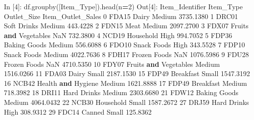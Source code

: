 \documentclass[
]{book}
\newenvironment{Shaded}{\begin{snugshade}}{\end{snugshade}}
\newcommand{\DecValTok}[1]{\textcolor[rgb]{0.00,0.00,0.81}{#1}}
\newcommand{\FloatTok}[1]{\textcolor[rgb]{0.00,0.00,0.81}{#1}}
\newcommand{\KeywordTok}[1]{\textcolor[rgb]{0.13,0.29,0.53}{\textbf{#1}}}
\newcommand{\NormalTok}[1]{#1}
\newcommand{\OperatorTok}[1]{\textcolor[rgb]{0.81,0.36,0.00}{\textbf{#1}}}
\newcommand{\StringTok}[1]{\textcolor[rgb]{0.31,0.60,0.02}{#1}}
\begin{document}
\begin{Shaded}
\begin{Highlighting}[]
\NormalTok{In [}\DecValTok{4}\NormalTok{]: df.groupby([}\StringTok{\textquotesingle{}Item\_Type\textquotesingle{}}\NormalTok{]).head(n}\OperatorTok{=}\DecValTok{2}\NormalTok{)}
\NormalTok{Out[}\DecValTok{4}\NormalTok{]:}
\NormalTok{    Item\_Identifier              Item\_Type Outlet\_Size  Item\_Outlet\_Sales}
\DecValTok{0}\NormalTok{             FDA15                  Dairy      Medium          }\FloatTok{3735.1380}
\DecValTok{1}\NormalTok{             DRC01            Soft Drinks      Medium           }\FloatTok{443.4228}
\DecValTok{2}\NormalTok{             FDN15                   Meat      Medium          }\FloatTok{2097.2700}
\DecValTok{3}\NormalTok{             FDX07  Fruits }\KeywordTok{and}\NormalTok{ Vegetables         NaN           }\FloatTok{732.3800}
\DecValTok{4}\NormalTok{             NCD19              Household        High           }\FloatTok{994.7052}
\DecValTok{5}\NormalTok{             FDP36           Baking Goods      Medium           }\FloatTok{556.6088}
\DecValTok{6}\NormalTok{             FDO10            Snack Foods        High           }\FloatTok{343.5528}
\DecValTok{7}\NormalTok{             FDP10            Snack Foods      Medium          }\FloatTok{4022.7636}
\DecValTok{8}\NormalTok{             FDH17           Frozen Foods         NaN          }\FloatTok{1076.5986}
\DecValTok{9}\NormalTok{             FDU28           Frozen Foods         NaN          }\FloatTok{4710.5350}
\DecValTok{10}\NormalTok{            FDY07  Fruits }\KeywordTok{and}\NormalTok{ Vegetables      Medium          }\FloatTok{1516.0266}
\DecValTok{11}\NormalTok{            FDA03                  Dairy       Small          }\FloatTok{2187.1530}
\DecValTok{15}\NormalTok{            FDP49              Breakfast       Small          }\FloatTok{1547.3192}
\DecValTok{16}\NormalTok{            NCB42     Health }\KeywordTok{and}\NormalTok{ Hygiene      Medium          }\FloatTok{1621.8888}
\DecValTok{17}\NormalTok{            FDP49              Breakfast      Medium           }\FloatTok{718.3982}
\DecValTok{18}\NormalTok{            DRI11            Hard Drinks      Medium          }\FloatTok{2303.6680}
\DecValTok{21}\NormalTok{            FDW12           Baking Goods      Medium          }\FloatTok{4064.0432}
\DecValTok{22}\NormalTok{            NCB30              Household       Small          }\FloatTok{1587.2672}
\DecValTok{27}\NormalTok{            DRJ59            Hard Drinks        High           }\FloatTok{308.9312}
\DecValTok{29}\NormalTok{            FDC14                 Canned       Small           }\FloatTok{125.8362}

\end{Highlighting}
\end{Shaded}
\end{document}
